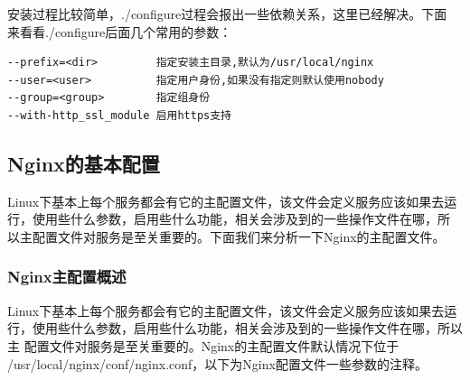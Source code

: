 安装过程比较简单，./configure过程会报出一些依赖关系，这里已经解决。下面
来看看./configure后面几个常用的参数：

\begin{verbatim}
--prefix=<dir>         指定安装主目录,默认为/usr/local/nginx
--user=<user>          指定用户身份,如果没有指定则默认使用nobody
--group=<group>        指定组身份
--with-http_ssl_module 启用https支持
\end{verbatim}

\subsection{Nginx的基本配置}
\label{subsec:NginxConf}

Linux下基本上每个服务都会有它的主配置文件，该文件会定义服务应该如果去运
行，使用些什么参数，启用些什么功能，相关会涉及到的一些操作文件在哪，所
以主配置文件对服务是至关重要的。下面我们来分析一下Nginx的主配置文件。

\subsubsection{Nginx主配置概述}

Linux下基本上每个服务都会有它的主配置文件，该文件会定义服务应该如果去运
行，使用些什么参数，启用些什么功能，相关会涉及到的一些操作文件在哪，所以主
配置文件对服务是至关重要的。Nginx的主配置文件默认情况下位于
/usr/local/nginx/conf/nginx.conf，以下为Nginx配置文件一些参数的注释。

